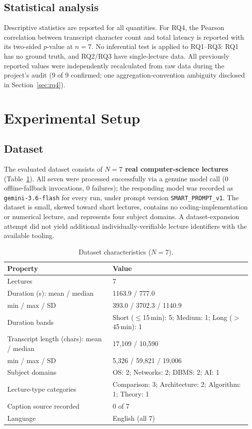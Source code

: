 \documentclass[conference]{IEEEtran}
\begin{document}
\subsection{Statistical analysis}
Descriptive statistics are reported for all quantities. For RQ4, the Pearson correlation between transcript character count and total latency is reported with its two-sided $p$-value at $n=7$. No inferential test is applied to RQ1--RQ3: RQ1 has no ground truth, and RQ2/RQ3 have single-lecture data. All previously reported values were independently recalculated from raw data during the project's audit (9 of 9 confirmed; one aggregation-convention ambiguity disclosed in Section~\ref{sec:rq4}).

\section{Experimental Setup}
\subsection{Dataset}
The evaluated dataset consists of \textbf{$N=7$ real computer-science lectures} (Table~\ref{tab:dataset}). All seven were processed successfully via a genuine model call (0 offline-fallback invocations, 0 failures); the responding model was recorded as \texttt{gemini-3.6-flash} for every run, under prompt version \texttt{SMART\_PROMPT\_v1}. The dataset is small, skewed toward short lectures, contains no coding-implementation or numerical lecture, and represents four subject domains. A dataset-expansion attempt did not yield additional individually-verifiable lecture identifiers with the available tooling.

\begin{table}[t]
\caption{Dataset characteristics ($N=7$).}
\label{tab:dataset}
\centering
\begin{tabular}{@{}p{}p{}@{}}
\toprule
\textbf{Property} & \textbf{Value} \\
\midrule
Lectures & 7 \\
Duration (s): mean / median & 1163.9 / 777.0 \\
\quad min / max / SD & 393.0 / 3702.3 / 1140.9 \\
Duration bands & Short ($\le$15\,min): 5; Medium: 1; Long ($>$45\,min): 1 \\
Transcript length (chars): mean / median & 17{,}109 / 10{,}590 \\
\quad min / max / SD & 5{,}326 / 59{,}821 / 19{,}006 \\
Subject domains & OS: 2; Networks: 2; DBMS: 2; AI: 1 \\
Lecture-type categories & Comparison: 3; Architecture: 2; Algorithm: 1; Theory: 1 \\
Caption source recorded & 0 of 7 \\
Language & English (all 7) \\
\bottomrule
\end{tabular}
\end{table}
\end{document}
